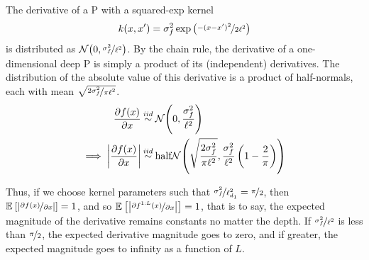 \documentclass[twoside]{article}
\makeatletter
\newlength{\nonHumbleHeight}
\def\@humbleformat#1{{\settoheight{\nonHumbleHeight}{#1}\resizebox{!}{0.94\nonHumbleHeight}{#1}}}%
\def\humble#1{\@humbleformat{#1}}%
\newcommand{\gp}{{\humble GP}}
\makeatother
\begin{document}
The derivative of a \gp{} with a squared-exp kernel 
%
\begin{align}
k(x, x') = \sigma^2_f \exp \left( \nicefrac{-(x - x')^2}{2\ell^2} \right)
\end{align}
%
 is distributed as $\mathcal{N}\!\left(0,\nicefrac{\sigma^2_f}{\ell^2}\right)$. By the chain rule, the derivative of a one-dimensional deep \gp{} is simply a product of its (independent) derivatives.  
 The distribution of the absolute value of this derivative is a product of half-normals, each with mean $\sqrt{\nicefrac{2 \sigma^2_f}{\pi\ell^2}}$.
%
\begin{align}
\frac{\partial f(x)}{\partial x} & \distas{iid} \Nt{0}{\frac{\sigma^2_f}{\ell^2}} \\
\implies 
\left| \frac{\partial f(x)}{\partial x} \right| & \distas{iid} \textnormal{half}\Nt{\sqrt{\frac{2 \sigma^2_f}{\pi\ell^2}}}{\frac{\sigma^2_f}{\ell^2} \left( 1 - \frac{2}{\pi} \right)}
\end{align}

Thus, if we choose kernel parameters such that $\nicefrac{\sigma^2_f}{\ell_{d_1}^2} = \nicefrac{\pi}{2}$, then $\mathbb{E}_{} \left[ {\left| \nicefrac{\partial f(x)}{\partial x} \right|} \right] = 1$, and so $\mathbb{E}_{} \left[ {\left| \nicefrac{\partial f^{1:L}(x)}{\partial x} \right|} \right] = 1$, that is to say, the expected magnitude of the derivative remains constants no matter the depth.  If $\nicefrac{\sigma^2_f}{\ell^2}$ is less than $\nicefrac{\pi}{2}$, the expected derivative magnitude goes to zero, and if greater, the expected magnitude goes to infinity as a function of $L$.  
\end{document}

